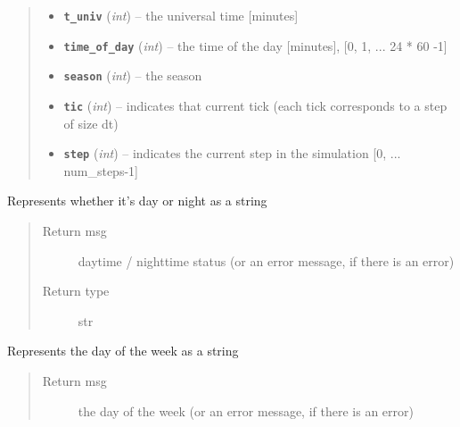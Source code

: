 \documentclass[letterpaper,10pt,english]{sphinxmanual}
\begin{document}
\begin{fulllineitems}
\begin{quote}
\begin{description}
\begin{itemize}
\item {} 
\textbf{\texttt{t\_univ}} (\emph{int}) -- the universal time {[}minutes{]}

\item {} 
\textbf{\texttt{time\_of\_day}} (\emph{int}) -- the time of the day {[}minutes{]}, {[}0, 1, ... 24 * 60 -1{]}

\item {} 
\textbf{\texttt{season}} (\emph{int}) -- the season

\item {} 
\textbf{\texttt{tic}} (\emph{int}) -- indicates that current tick (each tick corresponds to a step of size dt)

\item {} 
\textbf{\texttt{step}} (\emph{int}) -- indicates the current step in the simulation {[}0, ... num\_steps-1{]}

\end{itemize}

\end{description}\end{quote}

\begin{fulllineitems}
\label{temporal:temporal.Temporal.print_day_night}
Represents whether it's day or night as a string
\begin{quote}\begin{description}
\item[{Return msg}] \leavevmode
daytime / nighttime status (or an error message, if there is an error)

\item[{Return type}] \leavevmode
str

\end{description}\end{quote}

\end{fulllineitems}


\begin{fulllineitems}
\label{temporal:temporal.Temporal.print_day_of_week}
Represents the day of the week as a string
\begin{quote}\begin{description}
\item[{Return msg}] \leavevmode
the day of the week (or an error message, if there is an error)


\end{description}
\end{quote}
\end{fulllineitems}
\end{fulllineitems}
\end{document}
